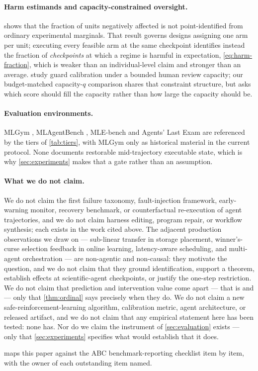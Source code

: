 \paragraph{Harm estimands and capacity-constrained oversight.}
\citet{kallus2022} shows that the fraction of units negatively affected is not
point-identified from ordinary experimental marginals.  That result governs
designs assigning one arm per unit; executing every feasible arm at the same
checkpoint identifies instead the fraction of \emph{checkpoints} at which a
regime is harmful in expectation, \eqref{eq:harm-fraction}, which is weaker than
an individual-level claim and stronger than an average.
\citet{oversightcapacity2026} study guard calibration under a bounded human
review capacity; our budget-matched capacity-$q$ comparison shares that
constraint structure, but asks which score should fill the capacity rather than
how large the capacity should be.

\paragraph{Evaluation environments.}
MLGym \citep{mlgym2025}, MLAgentBench \citep{mlagentbench2024}, MLE-bench
\citep{mlebench2024} and Agents' Last Exam \citep{ale2026} are referenced by the
tiers of \cref{tab:tiers}, with MLGym only as historical material in the
current protocol.  None documents restorable mid-trajectory executable state,
which is why \cref{sec:experiments} makes that a gate rather than an assumption.

\paragraph{What we do not claim.}
We do not claim the first failure taxonomy, fault-injection framework,
early-warning monitor, recovery benchmark, or counterfactual re-execution of
agent trajectories, and we do not claim harness editing, program repair, or
workflow synthesis; each exists in the work cited above.  The adjacent
production observations we draw on --- sub-linear transfer in storage
placement, winner's-curse selection feedback in online learning, latency-aware
scheduling, and multi-agent orchestration --- are non-agentic and non-causal:
they motivate the question, and we do not claim that they ground
identification, support a theorem, establish effects at scientific-agent
checkpoints, or justify the one-step restriction.  We do not claim that
prediction and intervention value come apart --- that is
\citet{interventionparadox2026} and \citet{calibrationnotcontrol2026} --- only
that \cref{thm:ordinal} says precisely when they do.  We do not claim a new
safe-reinforcement-learning algorithm, calibration metric, agent architecture,
or released artifact, and we do not claim that any empirical statement here has
been tested: none has.  Nor do we claim the instrument of \cref{sec:evaluation}
exists --- only that \cref{sec:experiments} specifies what would establish that
it does.


 maps this paper against the ABC benchmark-reporting
checklist item by item, with the owner of each outstanding item named.

